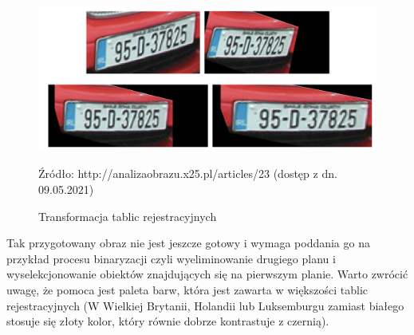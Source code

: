 \documentclass{article}
\begin{document}
	\begin{figure}
		\centering
		\includegraphics[width=15cm]{plates}
		\caption{Transformacja tablic rejestracyjnych}
		Źródło: http://analizaobrazu.x25.pl/articles/23 (dostęp z dn. 09.05.2021)
	\end{figure}
	\par
	Tak przygotowany obraz nie jest jeszcze gotowy i wymaga poddania go na przykład procesu binaryzacji czyli wyeliminowanie drugiego planu i wyselekcjonowanie obiektów znajdujących się na pierwszym planie. Warto zwrócić uwagę, że pomoca jest paleta barw, która jest zawarta w większości tablic rejestracyjnych (W Wielkiej Brytanii, Holandii lub Luksemburgu zamiast białego stosuje się złoty kolor, który równie dobrze kontrastuje z czernią).
\end{document}
